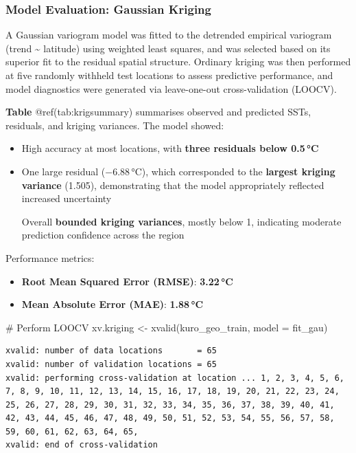 \documentclass[
  11pt,
]{article}
\newenvironment{Shaded}{\begin{snugshade}}{\end{snugshade}}
\newcommand{\AttributeTok}[1]{\textcolor[rgb]{0.40,0.45,0.13}{#1}}
\newcommand{\CommentTok}[1]{\textcolor[rgb]{0.37,0.37,0.37}{#1}}
\newcommand{\FunctionTok}[1]{\textcolor[rgb]{0.28,0.35,0.67}{#1}}
\newcommand{\NormalTok}[1]{\textcolor[rgb]{0.00,0.23,0.31}{#1}}
\newcommand{\OtherTok}[1]{\textcolor[rgb]{0.00,0.23,0.31}{#1}}
\begin{document}
\subsubsection{Model Evaluation: Gaussian
Kriging}\label{model-evaluation-gaussian-kriging}

A Gaussian variogram model was fitted to the detrended empirical
variogram (trend \textasciitilde{} latitude) using weighted least
squares, and was selected based on its superior fit to the residual
spatial structure. Ordinary kriging was then performed at five randomly
withheld test locations to assess predictive performance, and model
diagnostics were generated via leave-one-out cross-validation (LOOCV).

\textbf{Table} @ref(tab:krigsummary) summarises observed and predicted
SSTs, residuals, and kriging variances. The model showed:

\begin{itemize}
\item
  High accuracy at most locations, with \textbf{three residuals below
  0.5\,°C}
\item
  One large residual (−6.88\,°C), which corresponded to the
  \textbf{largest kriging variance} (1.505), demonstrating that the
  model appropriately reflected increased uncertainty

  Overall \textbf{bounded kriging variances}, mostly below 1, indicating
  moderate prediction confidence across the region
\end{itemize}

Performance metrics:

\begin{itemize}
\item
  \textbf{Root Mean Squared Error (RMSE)}: \textbf{3.22\,°C}
\item
  \textbf{Mean Absolute Error (MAE)}: \textbf{1.88\,°C}
\end{itemize}

\begin{Shaded}
\begin{Highlighting}[]
\CommentTok{\# Perform LOOCV}
\NormalTok{xv.kriging }\OtherTok{\textless{}{-}} \FunctionTok{xvalid}\NormalTok{(kuro\_geo\_train, }\AttributeTok{model =}\NormalTok{ fit\_gau)}
\end{Highlighting}
\end{Shaded}

\begin{verbatim}
xvalid: number of data locations       = 65
xvalid: number of validation locations = 65
xvalid: performing cross-validation at location ... 1, 2, 3, 4, 5, 6, 7, 8, 9, 10, 11, 12, 13, 14, 15, 16, 17, 18, 19, 20, 21, 22, 23, 24, 25, 26, 27, 28, 29, 30, 31, 32, 33, 34, 35, 36, 37, 38, 39, 40, 41, 42, 43, 44, 45, 46, 47, 48, 49, 50, 51, 52, 53, 54, 55, 56, 57, 58, 59, 60, 61, 62, 63, 64, 65, 
xvalid: end of cross-validation
\end{verbatim}
\end{document}
